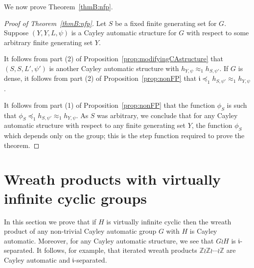 \documentclass[11pt]{amsart}
\newcommand{\preceqF}{\preceq_1}
\newcommand{\approxF}{\approx_1}
\theoremstyle{definition}
\newcommand\Z{\mathbb Z}
\newcommand{\ii}{\mathfrak{i}}
\begin{document}
We now prove Theorem~\ref{thmB:nfp}.


\ThmB*
\begin{proof}[Proof of Theorem~\ref{thmB:nfp}]
Let $S$ be a fixed finite generating set for $G$.
Suppose $(Y,Y, L, \psi)$ is a Cayley automatic structure for $G$ with respect to some arbitrary finite generating set $Y$.

It follows from part (2) of
Proposition~\ref{prop:modifyingCAstructure} that  $(S,S,L', \psi')$ is another Cayley automatic structure with $h_{Y,\psi}\approxF h_{S,\psi'}$.
If $G$ is dense, it follows from part (2) of Proposition~\ref{prop:nonFP} that  $\ii\preceqF h_{S,\psi'}\approxF h_{Y,\psi}$.

It follows from part (1) of Proposition~\ref{prop:nonFP} that the function $\phi_S$ is such that $\phi_S\preceqF h_{S,\psi'}\approxF h_{Y,\psi}$.
As $S$ was arbitrary, we conclude that for any Cayley automatic structure with respect to any finite generating set $Y$, the function $\phi_S$ which depends only on the group; this is the step function required to prove the theorem.
\end{proof}

\section{Wreath products with virtually infinite cyclic groups}


In this section we prove that if $H$ is virtually infinite cyclic then the wreath product of any non-trivial Cayley automatic group $G$ with $H$ is Cayley automatic.
Moreover, for any Cayley automatic structure, we see that $G \wr H$ is $\ii$-separated.
It follows, for example, that  iterated wreath products $\Z \wr \Z \wr \cdots \wr \Z$ are  Cayley automatic and $\ii$-separated.



\ThmC*
\end{document}
